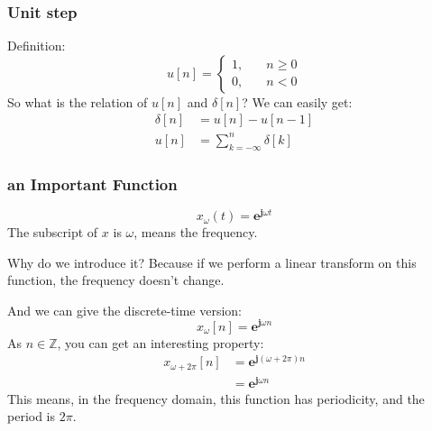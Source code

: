     \subsubsection{Unit step}
    Definition:
        \begin{equation}
            u[n] = 
            \left\{
            \begin{aligned}
                1, \quad & n \geq 0\\
                0, \quad & n < 0
            \end{aligned}
            \right.
        \end{equation}
    So what is the relation of $u[n]$ and $\delta[n]$? We can easily get:
        \begin{equation}
            \begin{aligned}
                \delta[n] &= u[n] - u[n-1] \\
                u[n]      &= \sum_{k=-\infty}^{n}\delta[k]
            \end{aligned}
        \end{equation}
    
    \subsubsection{an Important Function}
        \begin{equation}
            x_{\omega}(t) = \mathbf{e}^{\mathbf{j}\omega t}
        \end{equation}
    The subscript of $x$ is $\omega$, means the frequency.

    Why do we introduce it? Because if we perform a linear transform on this function, the frequency doesn't change.
    
    And we can give the discrete-time version:
        \begin{equation}
            x_{\omega}[n] = \mathbf{e}^{\mathbf{j}\omega n}
        \end{equation}
    As $n \in \mathbb{Z}$, you can get an interesting property:
        \begin{equation}
            \begin{aligned}
            x_{\omega + 2\pi}[n] &= \mathbf{e}^{\mathbf{j}(\omega+2\pi) n}\\
                                 &= \mathbf{e}^{\mathbf{j}\omega n}
            \end{aligned}
        \end{equation}
    This means, in the frequency domain, this function has periodicity, 
    and the period is $2\pi$.

